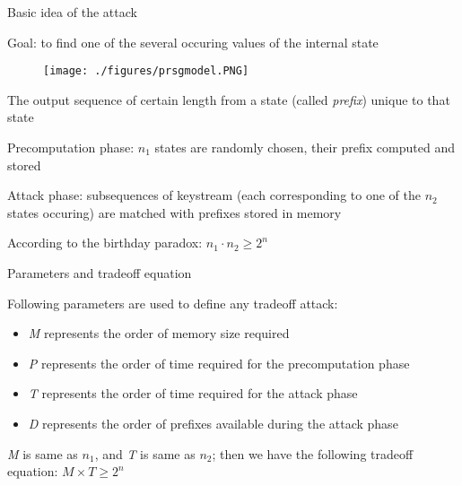 \documentclass{beamer}
\begin{document}
\begin{frame}{Basic idea of the attack}
\begin{itemize}
\small{
	\item Goal: to find one of the several occuring values of the internal state
}
\end{itemize}
	
	\begin{figure}[htp]
	\centering
	\texttt{[image: ./figures/prsgmodel.PNG]}
	\end{figure}

\begin{itemize}	
\small{
	\item The output sequence of certain length from a state (called \textit{prefix}) unique to that state
	\item Precomputation phase: $n_1$ states are randomly chosen, their prefix computed and stored
	\item Attack phase: subsequences of keystream (each corresponding to one of the $n_2$ states occuring) are matched with prefixes stored in memory
	\item According to the birthday paradox: $n_1 \cdot n_2 \geq 2^n$
}
\end{itemize}
\end{frame}

\begin{frame}{Parameters and tradeoff equation}

\begin{itemize}
\small{	
	\item Following parameters are used to define any tradeoff attack:
	\begin{itemize}
	\item \emph{M} represents the order of memory size required
	\item \emph{P} represents the order of time required for the precomputation phase
	\item \emph{T} represents the order of time required for the attack phase
	\item \emph{D} represents the order of prefixes available during the attack phase
	\end{itemize}
	\item \emph{M} is same as $n_1$, and \emph{T} is same as $n_2$; then we have the following tradeoff equation: $M \times T \geq 2^n$
}
\end{itemize}
\end{frame}
\end{document}
